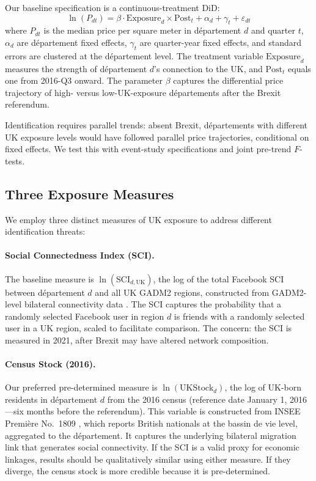 \documentclass[12pt]{article}
\begin{document}
Our baseline specification is a continuous-treatment DiD:
\begin{equation}\label{eq:baseline}
\ln(P_{dt}) = \beta \cdot \text{Exposure}_d \times \text{Post}_t + \alpha_d + \gamma_t + \varepsilon_{dt}
\end{equation}
where $P_{dt}$ is the median price per square meter in d\'epartement $d$ and quarter $t$, $\alpha_d$ are d\'epartement fixed effects, $\gamma_t$ are quarter-year fixed effects, and standard errors are clustered at the d\'epartement level. The treatment variable $\text{Exposure}_d$ measures the strength of d\'epartement $d$'s connection to the UK, and $\text{Post}_t$ equals one from 2016-Q3 onward. The parameter $\beta$ captures the differential price trajectory of high- versus low-UK-exposure d\'epartements after the Brexit referendum.

Identification requires parallel trends: absent Brexit, d\'epartements with different UK exposure levels would have followed parallel price trajectories, conditional on fixed effects. We test this with event-study specifications and joint pre-trend $F$-tests.

\subsection{Three Exposure Measures}

We employ three distinct measures of UK exposure to address different identification threats:

\paragraph{Social Connectedness Index (SCI).} The baseline measure is $\ln(\text{SCI}_{d,\text{UK}})$, the log of the total Facebook SCI between d\'epartement $d$ and all UK GADM2 regions, constructed from GADM2-level bilateral connectivity data \citep{bailey2018social}. The SCI captures the probability that a randomly selected Facebook user in region $d$ is friends with a randomly selected user in a UK region, scaled to facilitate comparison. The concern: the SCI is measured in 2021, after Brexit may have altered network composition.

\paragraph{Census Stock (2016).} Our preferred pre-determined measure is $\ln(\text{UKStock}_{d})$, the log of UK-born residents in d\'epartement $d$ from the 2016 census (reference date January 1, 2016---six months before the referendum). This variable is constructed from INSEE Premi\`ere No.\ 1809 \citep{insee2019premiere}, which reports British nationals at the bassin de vie level, aggregated to the d\'epartement. It captures the underlying bilateral migration link that generates social connectivity. If the SCI is a valid proxy for economic linkages, results should be qualitatively similar using either measure. If they diverge, the census stock is more credible because it is pre-determined.
\end{document}
